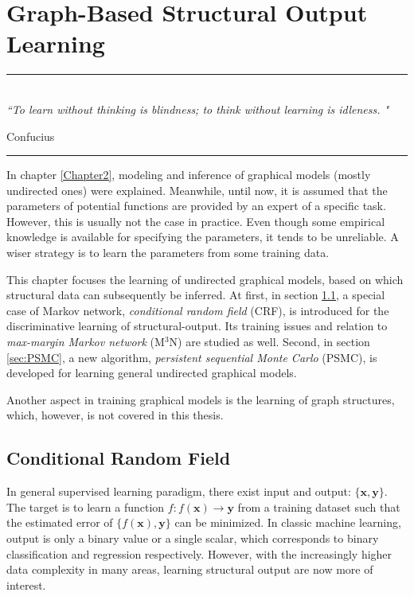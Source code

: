 
\chapter{Graph-Based Structural Output Learning} %
\label{Chapter3} %



\rule{\textwidth}{0.4pt} \\[0.5cm]
\textit{``To learn without thinking is blindness; to think without learning is idleness. "}

\begin{flushright}
Confucius
\end{flushright}
\rule{\textwidth}{0.4pt} 

In chapter \ref{Chapter2}, modeling and inference of graphical models (mostly undirected ones) were explained. Meanwhile, until now, it is assumed that   
the parameters of potential functions are provided by an expert of a specific task. However, this is usually not the case in practice.      
Even though some empirical knowledge is available for specifying the parameters, it tends to be unreliable. 
A wiser strategy is to learn the parameters from some training data.      

This chapter focuses the learning of undirected graphical models, based on which structural data can subsequently be inferred.      
At first, in section \ref{sec:crf}, a special case of Markov network, \emph{conditional random field} (CRF), is introduced for the discriminative learning      
of structural-output. Its training issues and relation to \emph{max-margin Markov network} (M$^3$N) are studied as well.   
Second, in section \ref{sec:PSMC},  a new algorithm, \emph{persistent sequential Monte Carlo} (PSMC), 
is developed for learning general undirected graphical models.   

Another aspect in training graphical models is the learning of graph structures, which, however, is not covered in this thesis.    


\section{Conditional Random Field}
\label{sec:crf}
In general supervised learning paradigm, there exist input and output: $\{\mathbf{x},\mathbf{y}\}$. The target is to learn a function       
$f:f(\mathbf{x})\rightarrow \mathbf{y}$ from a training dataset such that the estimated error of $\{f(\mathbf{x}),\mathbf{y}\}$ can be minimized.     
In classic machine learning, output is only a binary value or a single scalar, which corresponds to binary classification and regression respectively.      
However, with the increasingly higher data complexity in many areas, learning structural output are now more of interest.        


